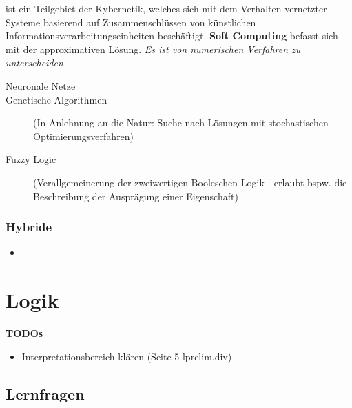 \documentclass[runningheads,deutsch]{llncs}
\begin{document}
ist ein Teilgebiet der Kybernetik, welches sich mit dem Verhalten vernetzter Systeme basierend auf Zusammenschlüssen von künstlichen Informationsverarbeitungseinheiten beschäftigt. \textbf{Soft Computing} befasst sich mit der approximativen Lösung. \textit{Es ist von numerischen Verfahren zu unterscheiden.}

\begin{description}
    \item[ Neuronale Netze]
    \item[ Genetische Algorithmen ] (In Anlehnung an die Natur: Suche nach Lösungen mit stochastischen Optimierungsverfahren)
    \item[ Fuzzy Logic ] (Verallgemeinerung der zweiwertigen Booleschen Logik - erlaubt bspw. die Beschreibung der Ausprägung einer Eigenschaft)
\end{description}

\subsubsection{Hybride}

\begin{itemize}
    \item 
\end{itemize}

\section{Logik}


\textbf{TODOs}
\begin{itemize}
    \item Interpretationsbereich klären (Seite 5 lprelim.div)
\end{itemize}

\subsection{Lernfragen}
\end{document}
